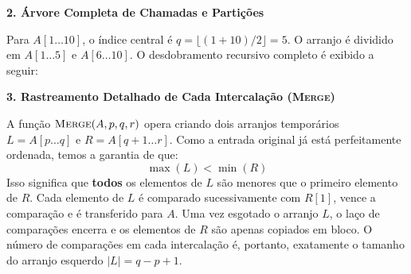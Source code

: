 \documentclass[11pt,a4paper]{article}
\newcommand{\topico}[1]{\par\medskip\textbf{\color{azul}#1}\par}
\begin{document}
\topico{2. Árvore Completa de Chamadas e Partições}
Para $A[1 \dots 10]$, o índice central é $q = \lfloor (1+10)/2 \rfloor = 5$. O arranjo é dividido em $A[1 \dots 5]$ e $A[6 \dots 10]$. O desdobramento recursivo completo é exibido a seguir:

\begin{center}
\end{center}

\topico{3. Rastreamento Detalhado de Cada Intercalação (\textsc{Merge})}
A função $\textsc{Merge}(A, p, q, r)$ opera criando dois arranjos temporários $L = A[p \dots q]$ e $R = A[q+1 \dots r]$.
Como a entrada original já está perfeitamente ordenada, temos a garantia de que:
\[
\max(L) < \min(R)
\]
Isso significa que \textbf{todos} os elementos de $L$ são menores que o primeiro elemento de $R$. Cada elemento de $L$ é comparado sucessivamente com $R[1]$, vence a comparação e é transferido para $A$. Uma vez esgotado o arranjo $L$, o laço de comparações encerra e os elementos de $R$ são apenas copiados em bloco. O número de comparações em cada intercalação é, portanto, exatamente o tamanho do arranjo esquerdo $|L| = q - p + 1$.
\end{document}
